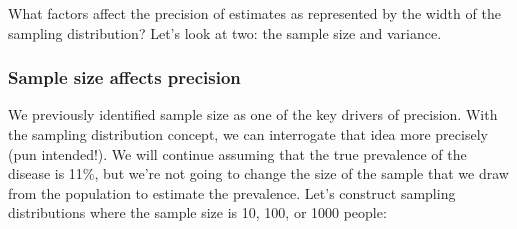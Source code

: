 \documentclass[
]{book}
\begin{document}
What factors affect the precision of estimates as represented by the width of the sampling distribution? Let's look at two: the sample size and variance.

\subsubsection{Sample size affects precision}\label{sample-size-affects-precision}

We previously identified sample size as one of the key drivers of precision. With the sampling distribution concept, we can interrogate that idea more precisely (pun intended!). We will continue assuming that the true prevalence of the disease is 11\%, but we're not going to change the size of the sample that we draw from the population to estimate the prevalence. Let's construct sampling distributions where the sample size is 10, 100, or 1000 people:
\end{document}
